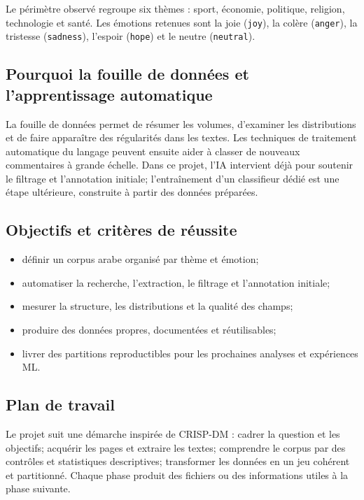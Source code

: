 \documentclass[11pt,a4paper]{article}
\begin{document}
Le périmètre observé regroupe six thèmes : sport, économie, politique, religion, technologie et santé. Les émotions retenues sont la joie (\texttt{joy}), la colère (\texttt{anger}), la tristesse (\texttt{sadness}), l'espoir (\texttt{hope}) et le neutre (\texttt{neutral}).

\subsection{Pourquoi la fouille de données et l'apprentissage automatique}
La fouille de données permet de résumer les volumes, d'examiner les distributions et de faire apparaître des régularités dans les textes. Les techniques de traitement automatique du langage peuvent ensuite aider à classer de nouveaux commentaires à grande échelle. Dans ce projet, l'IA intervient déjà pour soutenir le filtrage et l'annotation initiale; l'entraînement d'un classifieur dédié est une étape ultérieure, construite à partir des données préparées.

\subsection{Objectifs et critères de réussite}
\begin{itemize}
  \item définir un corpus arabe organisé par thème et émotion;
  \item automatiser la recherche, l'extraction, le filtrage et l'annotation initiale;
  \item mesurer la structure, les distributions et la qualité des champs;
  \item produire des données propres, documentées et réutilisables;
  \item livrer des partitions reproductibles pour les prochaines analyses et expériences ML.
\end{itemize}

\subsection{Plan de travail}
Le projet suit une démarche inspirée de CRISP-DM : cadrer la question et les objectifs; acquérir les pages et extraire les textes; comprendre le corpus par des contrôles et statistiques descriptives; transformer les données en un jeu cohérent et partitionné. Chaque phase produit des fichiers ou des informations utiles à la phase suivante.
\end{document}
